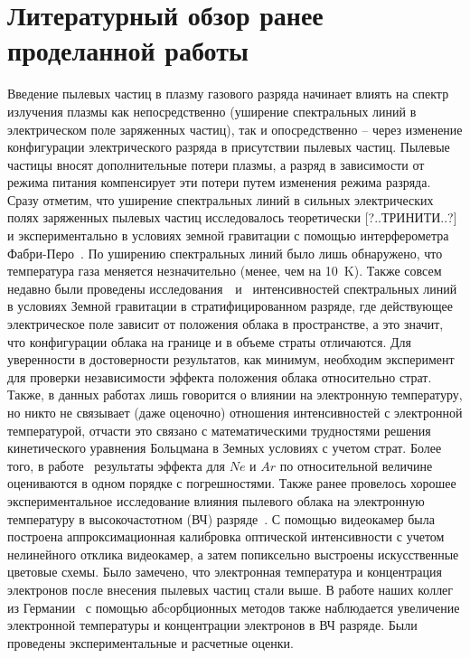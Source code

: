 \section{Литературный обзор ранее проделанной работы}
Введение пылевых частиц в плазму газового разряда начинает влиять на спектр излучения плазмы как
непосредственно (уширение спектральных линий в электрическом поле заряженных частиц),
так и опосредственно – через изменение конфигурации электрического разряда в присутствии пылевых частиц.
Пылевые частицы вносят дополнительные потери плазмы, а разряд в зависимости от режима питания компенсирует
эти потери путем изменения режима разряда. Сразу отметим, что уширение спектральных линий в сильных
электрических полях заряженных пылевых частиц исследовалось теоретически [?..ТРИНИТИ..?] и экспериментально в условиях
земной гравитации с помощью интерферометра Фабри-Перо~\cite{Pikalev2014}. По уширению спектральных линий было лишь обнаружено, что
температура газа меняется незначительно (менее, чем на 10~K).
Также совсем недавно были проведены исследования~\cite{Pikalev2018}~и~\cite{Kostenko} интенсивностей спектральных линий в условиях
Земной гравитации в стратифицированном разряде, где действующее электрическое поле зависит от
положения облака в пространстве, а это значит, что конфигурации облака на границе и в объеме страты отличаются.
Для уверенности в достоверности результатов, как минимум, необходим эксперимент для проверки независимости эффекта
положения облака относительно страт. Также, в данных работах лишь говорится о влиянии на электронную температуру, но никто
не связывает (даже оценочно) отношения интенсивностей с электронной температурой, отчасти это связано с математическими
трудностями решения кинетического уравнения Больцмана в Земных условиях с учетом страт. Более того, в работе~\cite{Pikalev2018}
результаты эффекта для $Ne$ и $Ar$ по относительной величине оцениваются в одном порядке с погрешностями.
Также ранее провелось хорошее экспериментальное исследование влияния пылевого облака на электронную температуру в
высокочастотном (ВЧ) разряде~\cite{Samsonov1999}. С помощью видеокамер была построена аппроксимационная калибровка
оптической интенсивности с учетом нелинейного отклика видеокамер, а затем попиксельно выстроены искусственные
цветовые схемы. Было замечено, что электронная температура и концентрация электронов после внесения пылевых частиц стали выше.
В работе наших коллег из Германии~\cite{Mitic2009} с помощью абcорбционных методов также наблюдается увеличение
электронной температуры и концентрации электронов в ВЧ разряде. Были проведены экспериментальные и расчетные оценки.

